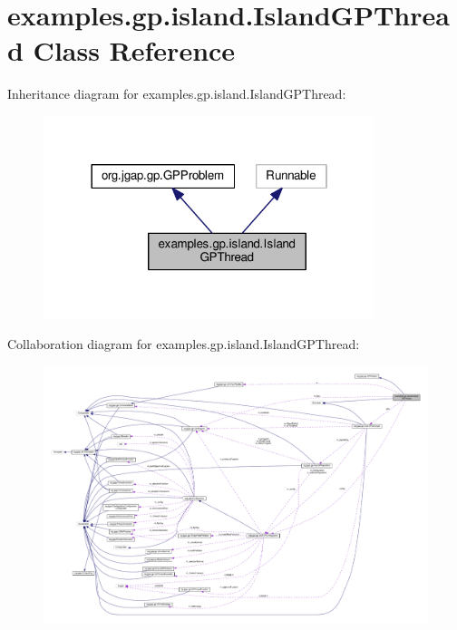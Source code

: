 \hypertarget{classexamples_1_1gp_1_1island_1_1_island_g_p_thread}{\section{examples.\-gp.\-island.\-Island\-G\-P\-Thread Class Reference}
\label{classexamples_1_1gp_1_1island_1_1_island_g_p_thread}
}


Inheritance diagram for examples.\-gp.\-island.\-Island\-G\-P\-Thread\-:
\nopagebreak
\begin{figure}[H]
\begin{center}
\leavevmode
\includegraphics[width=273pt]{classexamples_1_1gp_1_1island_1_1_island_g_p_thread__inherit__graph}
\end{center}
\end{figure}


Collaboration diagram for examples.\-gp.\-island.\-Island\-G\-P\-Thread\-:
\nopagebreak
\begin{figure}[H]
\begin{center}
\leavevmode
\includegraphics[width=350pt]{classexamples_1_1gp_1_1island_1_1_island_g_p_thread__coll__graph}
\end{center}
\end{figure}
